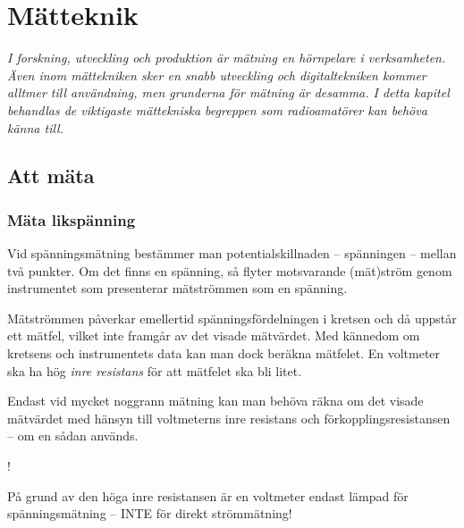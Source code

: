 \chapter{Mätteknik}

\noindent\emph{I forskning, utveckling och produktion är mätning en hörnpelare
  i verksamheten. Även inom mättekniken sker en snabb utveckling och
  digitaltekniken kommer alltmer till användning, men grunderna för
  mätning är desamma. I detta kapitel behandlas de viktigaste
  mättekniska begreppen som radioamatörer kan behöva känna till.}

\section{Att mäta}

\subsection{Mäta likspänning}
\label{mäta_likspänning}

Vid spänningsmätning bestämmer man potentialskillnaden -- spänningen --
mellan två punkter.
Om det finns en spänning, så flyter motsvarande (mät)ström genom
instrumentet som presenterar mätströmmen som en spänning.

Mätströmmen påverkar emellertid spänningsfördelningen i kretsen och då
uppstår ett mätfel, vilket inte framgår av det visade mätvärdet.
Med kännedom om kretsens och instrumentets data kan man dock beräkna mätfelet.
En voltmeter ska ha hög \emph{inre resistans} för att mätfelet ska bli litet.

Endast vid mycket noggrann mätning kan man behöva räkna om det visade
mätvärdet med hänsyn till voltmeterns inre resistans och
förkopplingsresistansen -- om en sådan används.

\begin{center}
\begin{minipage}{0.19\columnwidth}
  \Huge{\hspace{1ex}!}
\end{minipage}
\begin{minipage}{0.7\columnwidth}
På grund av den höga inre resistansen är en voltmeter endast lämpad
för spänningsmätning -- INTE för direkt strömmätning!
\end{minipage}
\end{center}


